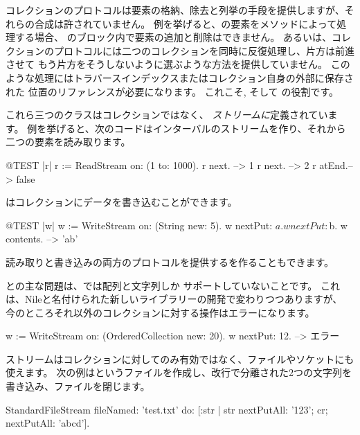 \documentclass[a4paper,10pt,twoside]{book}
\begin{document}
コレクションのプロトコルは要素の格納、除去と列挙の手段を提供しますが、それらの合成は許されていません。
例を挙げると、の要素をメソッドによって処理する場合、
のブロック内で要素の追加と削除はできません。
あるいは、コレクションのプロトコルには二つのコレクションを同時に反復処理し、片方は前進させて
もう片方をそうしないように選ぶような方法を提供していません。
このような処理にはトラバースインデックスまたはコレクション自身の外部に保存された
位置のリファレンスが必要になります。
これこそ,   そして の役割です。



これら三つのクラスはコレクションではなく、 \emph{ストリームに}定義されています。
例を挙げると、次のコードはインターバルのストリームを作り、それから二つの要素を読み取ります。


\begin{code}{@TEST |r|}
r := ReadStream on: (1 to: 1000).
r next.   --> 1
r next.   --> 2
r atEnd.--> false
\end{code}

はコレクションにデータを書き込むことができます。


\begin{code}{@TEST |w|}
w := WriteStream on: (String new: 5).
w nextPut: $a.
w nextPut: $b.
w contents. -->  'ab'
\end{code}

読み取りと書き込みの両方のプロトコルを提供するを作ることもできます。

との主な問題は、\pharo では配列と文字列しか
サポートしていないことです。
これは、Nileと名付けられた新しいライブラリーの開発で変わりつつありますが、
今のところそれ以外のコレクションに対する操作はエラーになります。

\begin{code}{}
w := WriteStream on: (OrderedCollection new: 20).
w nextPut: 12. -->  エラー
\end{code}

ストリームはコレクションに対してのみ有効ではなく、ファイルやソケットにも使えます。
次の例はというファイルを作成し、改行で分離された2つの文字列を書き込み、ファイルを閉じます。

\begin{code}{}
StandardFileStream
  fileNamed: 'test.txt'
  do: [:str | str
                nextPutAll: '123';
                cr;
                nextPutAll: 'abcd'].
\end{code}
\end{document}
